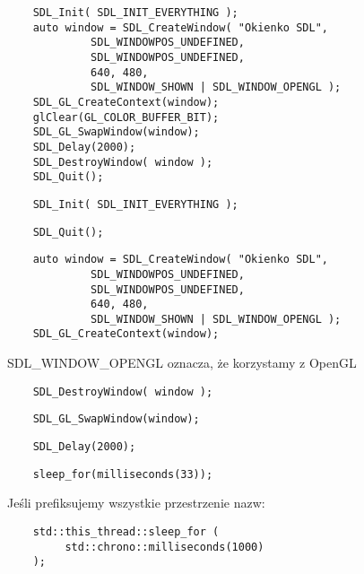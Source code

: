 \documentclass{beamer}
\begin{document}
\begin{frame}[fragile]
	\begin{verbatim}
    SDL_Init( SDL_INIT_EVERYTHING ); 
    auto window = SDL_CreateWindow( "Okienko SDL", 
             SDL_WINDOWPOS_UNDEFINED, 
             SDL_WINDOWPOS_UNDEFINED, 
             640, 480, 
             SDL_WINDOW_SHOWN | SDL_WINDOW_OPENGL ); 
    SDL_GL_CreateContext(window);
    glClear(GL_COLOR_BUFFER_BIT);
    SDL_GL_SwapWindow(window);
    SDL_Delay(2000);
    SDL_DestroyWindow( window );
    SDL_Quit(); 
 	\end{verbatim}
 	\EB
\end{frame}


\begin{frame}[fragile]
	\begin{verbatim}
    SDL_Init( SDL_INIT_EVERYTHING ); 
 	\end{verbatim}
 	\EB
	\begin{verbatim}
    SDL_Quit(); 
 	\end{verbatim}
 	\EB
\end{frame}
\begin{frame}[fragile]
	\begin{verbatim}
    auto window = SDL_CreateWindow( "Okienko SDL", 
             SDL_WINDOWPOS_UNDEFINED, 
             SDL_WINDOWPOS_UNDEFINED, 
             640, 480, 
             SDL_WINDOW_SHOWN | SDL_WINDOW_OPENGL ); 
    SDL_GL_CreateContext(window);
 	\end{verbatim}
 	SDL\_WINDOW\_OPENGL oznacza, że korzystamy z OpenGL
 	\EB
	\begin{verbatim}
    SDL_DestroyWindow( window );
 	\end{verbatim}
 	\EB
\end{frame}
\begin{frame}[fragile]
	\begin{verbatim}
    SDL_GL_SwapWindow(window);
 	\end{verbatim}
 	\EB
\end{frame}
\begin{frame}[fragile]
	\begin{verbatim}
    SDL_Delay(2000);
 	\end{verbatim}
 	\EB
	\begin{verbatim}
    sleep_for(milliseconds(33));
 	\end{verbatim}
 	Jeśli prefiksujemy wszystkie przestrzenie nazw:
	\begin{verbatim}
    std::this_thread::sleep_for ( 
         std::chrono::milliseconds(1000)
    );
 	\end{verbatim}
 	\EB
\end{frame}
\end{document}
